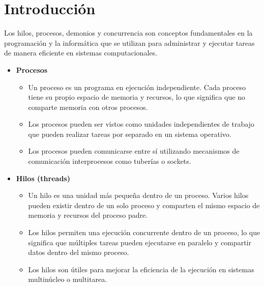 \documentclass{dense_template}
\begin{document}
\maketitle
\tableofcontents
\newpage
\section{Introducción}
Los hilos, procesos, demonios y concurrencia son conceptos fundamentales en la programación y la informática que se utilizan para administrar y ejecutar tareas de manera eficiente en sistemas computacionales.

\begin{itemize}
    \item \textbf{Procesos}
    \begin{itemize}
        \item Un proceso es un programa en ejecución independiente. Cada proceso tiene su propio espacio de memoria y recursos, lo que significa que no comparte memoria con otros procesos.
    \end{itemize}
    \begin{itemize}
        \item Los procesos pueden ser vistos como unidades independientes de trabajo que pueden realizar tareas por separado en un sistema operativo.
    \end{itemize}
    \begin{itemize}
        \item Los procesos pueden comunicarse entre sí utilizando mecanismos de comunicación interprocesos como tuberías o sockets.
    \end{itemize}
    \item \textbf{Hilos (threads)}
    \begin{itemize}
        \item Un hilo es una unidad más pequeña dentro de un proceso. Varios hilos pueden existir dentro de un solo proceso y comparten el mismo espacio de memoria y recursos del proceso padre.
    \end{itemize}
    \begin{itemize}
        \item Los hilos permiten una ejecución concurrente dentro de un proceso, lo que significa que múltiples tareas pueden ejecutarse en paralelo y compartir datos dentro del mismo proceso.
    \end{itemize}
    \begin{itemize}
        \item Los hilos son útiles para mejorar la eficiencia de la ejecución en sistemas multinúcleo o multitarea.

\end{itemize}
\end{itemize}
\end{document}
